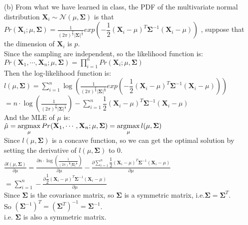 \documentclass[10pt]{article}
\begin{document}
\begin{enumerate}[1.]
(b) From what we have learned in class, the PDF of the multivariate normal distribution
$\mathbf{X}_i\sim \mathcal{N}(\mu, \mathbf{\Sigma})$ is that $Pr(\mathbf{X}_i;\mu,\mathbf{\Sigma})=\frac{1}{(2\pi)^\frac{p}{2}|\mathbf{\Sigma}|^{\frac{1}{2}}}exp(-\dfrac{1}{2}(\mathbf{X}_i-\mu)^T\mathbf{\Sigma}^{-1}(\mathbf{X}_i-\mu))$
, suppose that the dimension of $\mathbf{X}_i$ is $p$.\\
Since the sampling are independent, so the likelihood function is:\\
$Pr(\mathbf{X}_1,\cdots,\mathbf{X}_n;\mu,\mathbf{\Sigma})=\prod\limits_{i=1}^nPr(\mathbf{X}_i;\mu,\mathbf{\Sigma})$\\
Then the log-likelihood function is:\\
$l(\mu,\mathbf{\Sigma})=\sum\limits_{i=1}^n\log(\frac{1}{(2\pi)^\frac{p}{2}|\mathbf{\Sigma}|^{\frac{1}{2}}}exp(-\dfrac{1}{2}(\mathbf{X}_i-\mu)^T\mathbf{\Sigma}^{-1}(\mathbf{X}_i-\mu)))$\\
$=n\cdot\log(\frac{1}{(2\pi)^\frac{p}{2}|\mathbf{\Sigma}|^{\frac{1}{2}}})-\sum\limits_{i=1}^n\dfrac{1}{2}(\mathbf{X}_i-\mu)^T\mathbf{\Sigma}^{-1}(\mathbf{X}_i-\mu)$\\

And the MLE of $\mu$ is:\\
$\hat{\mu}=\mathop{\rm argmax}\limits_{\mu}Pr(\mathbf{X}_1,\cdots,\mathbf{X}_n;\mu,\mathbf{\Sigma})=\mathop{\rm argmax}\limits_{\mu}l(\mu,\mathbf{\Sigma})$\\
Since $l(\mu,\mathbf{\Sigma})$ is a concave function, so we can get the optimal solution by setting the derivative of $l(\mu,\mathbf{\Sigma})$ to 0.\\
$\frac{\partial l(\mu,\mathbf{\Sigma})}{\partial \mu}=\frac{\partial n\cdot\log(\frac{1}{(2\pi)^\frac{p}{2}|\mathbf{\Sigma}|^{\frac{1}{2}}})}{\partial \mu}-\frac{\partial \sum\limits_{i=1}^n\dfrac{1}{2}(\mathbf{X}_i-\mu)^T\mathbf{\Sigma}^{-1}(\mathbf{X}_i-\mu)}{\partial \mu}$\\
$=\sum\limits_{i=1}^n-\frac{\partial \dfrac{1}{2}(\mathbf{X}_i-\mu)^T\mathbf{\Sigma}^{-1}(\mathbf{X}_i-\mu)}{\partial \mu}$\\

Since $\mathbf{\Sigma}$ is the covariance matrix, so $\mathbf{\Sigma}$ is a symmetric matrix, i.e.$\mathbf{\Sigma}=\mathbf{\Sigma}^T$.\\
So $(\mathbf{\Sigma}^{-1})^T=(\mathbf{\Sigma}^T)^{-1}=\mathbf{\Sigma}^{-1}$.\\
i.e. $\mathbf{\Sigma}$ is also a symmetric matrix.\\


\end{enumerate}
\end{document}
